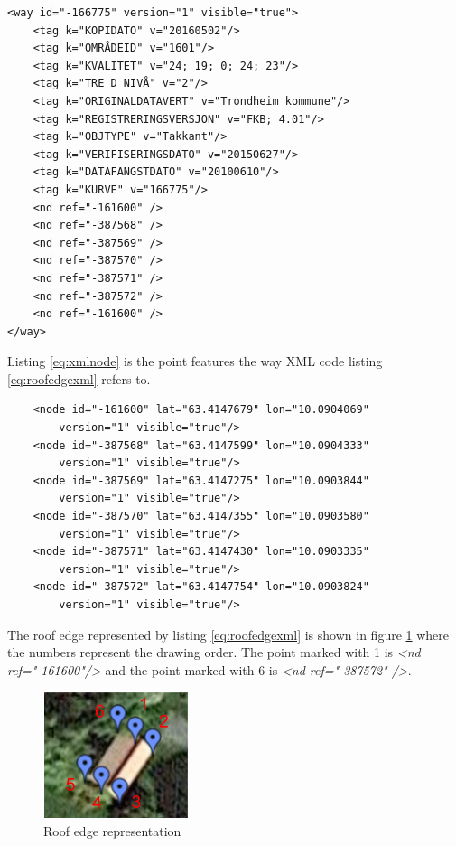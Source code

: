 \begin{lstlisting}
<way id="-166775" version="1" visible="true">
	<tag k="KOPIDATO" v="20160502"/>
	<tag k="OMRÅDEID" v="1601"/>
	<tag k="KVALITET" v="24; 19; 0; 24; 23"/>
	<tag k="TRE_D_NIVÅ" v="2"/>
	<tag k="ORIGINALDATAVERT" v="Trondheim kommune"/>
	<tag k="REGISTRERINGSVERSJON" v="FKB; 4.01"/>
	<tag k="OBJTYPE" v="Takkant"/>
	<tag k="VERIFISERINGSDATO" v="20150627"/>
	<tag k="DATAFANGSTDATO" v="20100610"/>
	<tag k="KURVE" v="166775"/>
	<nd ref="-161600" />
	<nd ref="-387568" />
	<nd ref="-387569" />
	<nd ref="-387570" />
	<nd ref="-387571" />
	<nd ref="-387572" />
	<nd ref="-161600" />
</way>
\end{lstlisting}

Listing \ref{eq:xmlnode} is the point features the way XML code listing \ref{eq:roofedgexml} refers to. 

\begin{lstlisting}
	<node id="-161600" lat="63.4147679" lon="10.0904069" 
		version="1" visible="true"/>
	<node id="-387568" lat="63.4147599" lon="10.0904333" 
		version="1" visible="true"/>
	<node id="-387569" lat="63.4147275" lon="10.0903844" 
		version="1" visible="true"/>
	<node id="-387570" lat="63.4147355" lon="10.0903580" 
		version="1" visible="true"/>
	<node id="-387571" lat="63.4147430" lon="10.0903335" 
		version="1" visible="true"/>
	<node id="-387572" lat="63.4147754" lon="10.0903824" 
		version="1" visible="true"/>
\end{lstlisting}

The roof edge represented by listing \ref{eq:roofedgexml} is shown in figure \ref{fig:roofedgeeks} where the numbers represent the drawing order. The point marked with 1 is \textit{<nd ref="-161600"/>} and the point marked with 6 is \textit{<nd ref="-387572" />}. 

\begin{figure}[H]
    \centering
    \includegraphics[scale=0.9]{figures/FixedByMe/sosiArea.png}
    \caption{Roof edge representation}
    \label{fig:roofedgeeks}
\end{figure} 


